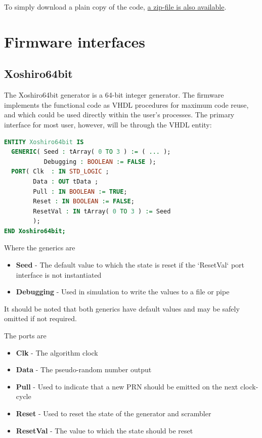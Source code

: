 \documentclass{article}
\begin{document}
To simply download a plain copy of the code, \href{https://github.com/Cefhalic/PRNG/archive/refs/heads/main.zip}{a zip-file is also available}.

\section{Firmware interfaces}
\subsection{Xoshiro64bit}

The Xoshiro64bit generator is a 64-bit integer generator. The firmware implements the functional code as VHDL procedures for maximum code reuse, and which could be used directly within the user's processes. The primary interface for most user, however, will be through the VHDL entity:

\begin{minipage}{1.0\textwidth}
\centering
\begin{lstlisting}[language=VHDL, label=lst:Xoshiro64bit_entity]
ENTITY Xoshiro64bit IS
  GENERIC( Seed : tArray( 0 TO 3 ) := ( ... );
           Debugging : BOOLEAN := FALSE );
  PORT( Clk  : IN STD_LOGIC ;
        Data : OUT tData ;
        Pull : IN BOOLEAN := TRUE;
        Reset : IN BOOLEAN := FALSE;
        ResetVal : IN tArray( 0 TO 3 ) := Seed
        );
END Xoshiro64bit;
\end{lstlisting}
\end{minipage}

Where the generics are

\begin{itemize}
\item \textbf{Seed} - The default value to which the state is reset if the `ResetVal` port interface is not instantiated
\item \textbf{Debugging} - Used in simulation to write the values to a file or pipe
\end{itemize}

It should be noted that both generics have default values and may be safely omitted if not required.

The ports are 

\begin{itemize}
\item \textbf{Clk} - The algorithm clock
\item \textbf{Data} - The pseudo-random number output
\item \textbf{Pull} - Used to indicate that a new PRN should be emitted on the next clock-cycle
\item \textbf{Reset} - Used to reset the state of the generator and scrambler
\item \textbf{ResetVal} - The value to which the state should be reset
\end{itemize}
\end{document}
